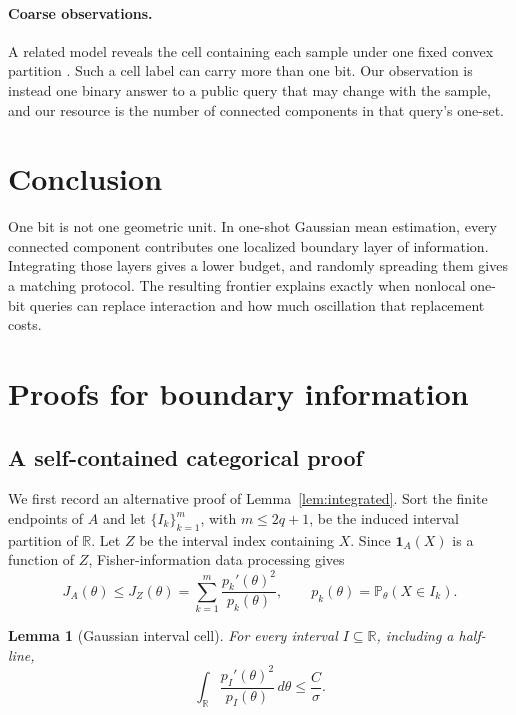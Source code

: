 \documentclass{article}
\newtheorem{lemma}[theorem]{Lemma}
\theoremstyle{definition}
\theoremstyle{remark}
\newcommand{\Prb}{\mathbb P}
\newcommand{\R}{\mathbb R}
\newcommand{\1}{\mathbf 1}
\begin{document}
\paragraph{Coarse observations.} A related model reveals the cell containing each sample under one fixed convex partition \citep{kalavasis2026coarse}. Such a cell label can carry more than one bit. Our observation is instead one binary answer to a public query that may change with the sample, and our resource is the number of connected components in that query's one-set.

\section{Conclusion}

One bit is not one geometric unit. In one-shot Gaussian mean estimation, every connected component contributes one localized boundary layer of information. Integrating those layers gives a lower budget, and randomly spreading them gives a matching protocol. The resulting frontier explains exactly when nonlocal one-bit queries can replace interaction and how much oscillation that replacement costs.




\appendix

\section{Proofs for boundary information}\label{app:information}

\subsection{A self-contained categorical proof}

We first record an alternative proof of Lemma~\ref{lem:integrated}. Sort the finite endpoints of \(A\) and let \(\{I_k\}_{k=1}^m\), with \(m\leq2q+1\), be the induced interval partition of \(\R\). Let \(Z\) be the interval index containing \(X\). Since \(\1_A(X)\) is a function of \(Z\), Fisher-information data processing gives \[ J_A(\theta)\leq J_Z(\theta) =\sum_{k=1}^m\frac{p_k'(\theta)^2}{p_k(\theta)}, \qquad p_k(\theta)=\Prb_\theta(X\in I_k). \tag{24} \]

\begin{lemma}[Gaussian interval cell]\label{lem:cell}
For every interval \(I\subseteq\R\), including a half-line, \[ \int_\R\frac{p_I'(\theta)^2}{p_I(\theta)}\,d\theta\leq\frac C\sigma. \tag{25} \]
\end{lemma}
\end{document}
